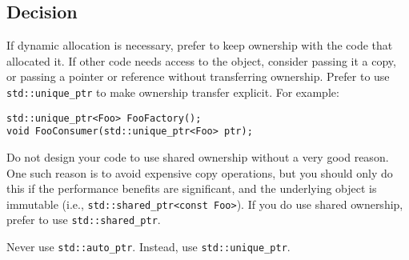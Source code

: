 \subsection{Decision}
If dynamic allocation is necessary, prefer to keep ownership with the code that allocated it. If other code needs access to the object, consider passing it a copy, or passing a pointer or reference without transferring ownership. Prefer to use \texttt{std::unique_ptr} to make ownership transfer explicit. For example:
\begin{verbatim}
std::unique_ptr<Foo> FooFactory();
void FooConsumer(std::unique_ptr<Foo> ptr);
\end{verbatim}
Do not design your code to use shared ownership without a very good reason. One such reason is to avoid expensive copy operations, but you should only do this if the performance benefits are significant, and the underlying object is immutable (i.e., \texttt{std::shared_ptr<const Foo>}). If you do use shared ownership, prefer to use \texttt{std::shared_ptr}.

Never use \texttt{std::auto_ptr}. Instead, use \texttt{std::unique_ptr}.

